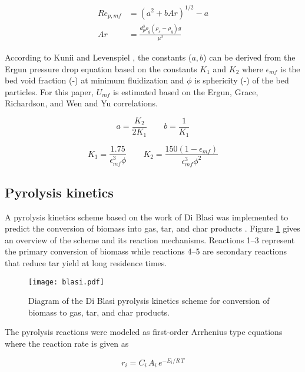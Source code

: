 \begin{align}
    Re_{p,mf} &= \left( a^2 + b Ar \right)^{1/2} - a \\
    Ar &= \frac{d_p^3 \rho_g (\rho_s - \rho_g) g}{\mu^2}
\end{align}

According to Kunii and Levenspiel \cite{Levenspiel-1991}, the constants ($a, b$) can be derived from the Ergun pressure drop equation based on the constants $K_1$ and $K_2$ where $\epsilon_{mf}$ is the bed void fraction (-) at minimum fluidization and $\phi$ is sphericity (-) of the bed particles. For this paper, $U_{mf}$ is estimated based on the Ergun, Grace, Richardson, and Wen and Yu correlations.

\begin{equation}
    a = \frac{K_2}{2 K_1} \qquad
    b = \frac{1}{K_1}
\end{equation}

\begin{equation}
    K_1 = \frac{1.75}{\epsilon_{mf}^3 \phi} \qquad
    K_2 = \frac{150(1-\epsilon_{mf})}{\epsilon_{mf}^3 \phi^2}
\end{equation}

\subsection{Pyrolysis kinetics}

A pyrolysis kinetics scheme based on the work of Di Blasi was implemented to predict the conversion of biomass into gas, tar, and char products \cite{Blasi-1993,Blasi-2001}. Figure \ref{fig:blasi} gives an overview of the scheme and its reaction mechanisms. Reactions 1--3 represent the primary conversion of biomass while reactions 4--5 are secondary reactions that reduce tar yield at long residence times.

\begin{figure}[H]
    \centering
    \texttt{[image: blasi.pdf]}
    \caption{Diagram of the Di Blasi pyrolysis kinetics scheme for conversion of biomass to gas, tar, and char products.}
    \label{fig:blasi}
\end{figure}

The pyrolysis reactions were modeled as first-order Arrhenius type equations where the reaction rate is given as

\begin{equation}
    r_i = C_i\,A_i\,e^{-E_i / R\,T}
\end{equation}

